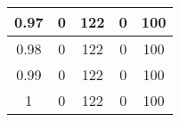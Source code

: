\begin{table}[H]
\begin{tabular}{ccccc}
    \multicolumn{1}{|c|}{0.97}                              & \multicolumn{1}{c|}{0}                     & \multicolumn{1}{c|}{122}                   & \multicolumn{1}{c|}{0}                     & \multicolumn{1}{c|}{100}                   \\ \hline
    \multicolumn{1}{|c|}{0.98}                              & \multicolumn{1}{c|}{0}                     & \multicolumn{1}{c|}{122}                   & \multicolumn{1}{c|}{0}                     & \multicolumn{1}{c|}{100}                   \\ \hline
    \multicolumn{1}{|c|}{0.99}                              & \multicolumn{1}{c|}{0}                     & \multicolumn{1}{c|}{122}                   & \multicolumn{1}{c|}{0}                     & \multicolumn{1}{c|}{100}                   \\ \hline
    \multicolumn{1}{|c|}{1}                                 & \multicolumn{1}{c|}{0}                     & \multicolumn{1}{c|}{122}                   & \multicolumn{1}{c|}{0}                     & \multicolumn{1}{c|}{100}                   \\ \hline
    \end{tabular}
    \label{tab:example-generated}
    \end{table}